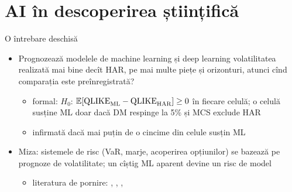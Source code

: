 \section{AI în descoperirea științifică}

\begin{frame}{O întrebare deschisă}
\itemsize{\small}
\begin{itemize}
    \item Prognozează modelele de machine learning și deep learning volatilitatea realizată mai bine decît HAR, pe mai multe piețe și orizonturi, atunci cînd comparația este preînregistrată?
    \begin{itemize}
        \item formal: $H_0$: $\mathbb{E}[\mathrm{QLIKE}_{\mathrm{ML}} - \mathrm{QLIKE}_{\mathrm{HAR}}] \ge 0$ în fiecare celulă; o celulă susține ML doar dacă DM respinge la 5\% și MCS exclude HAR
        \item infirmată dacă mai puțin de o cincime din celule susțin ML
    \end{itemize}
    \item Miza: sistemele de risc (VaR, marje, acoperirea opțiunilor) se bazează pe prognoze de volatilitate; un cîștig ML aparent devine un risc de model
    \begin{itemize}
        \item literatura de pornire: , , , 
    \end{itemize}
\end{itemize}
\end{frame}

